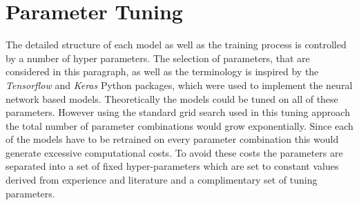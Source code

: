 \section{Parameter Tuning}
The detailed structure of each model as well as the training process is controlled by a number of hyper parameters. The selection of parameters, that are considered in this paragraph, as well as the terminology is inspired by the \textit{Tensorflow} and \textit{Keras} Python packages, which were used to implement the neural network based models. Theoretically the models could be tuned on all of these parameters. However using the standard grid search used in this tuning approach the total number of parameter combinations would grow exponentially. Since each of the models have to be retrained on every parameter combination this would generate excessive computational costs. To avoid these costs the parameters are separated into a set of fixed hyper-parameters which are set to constant values derived from experience and literature and a complimentary set of tuning parameters.

